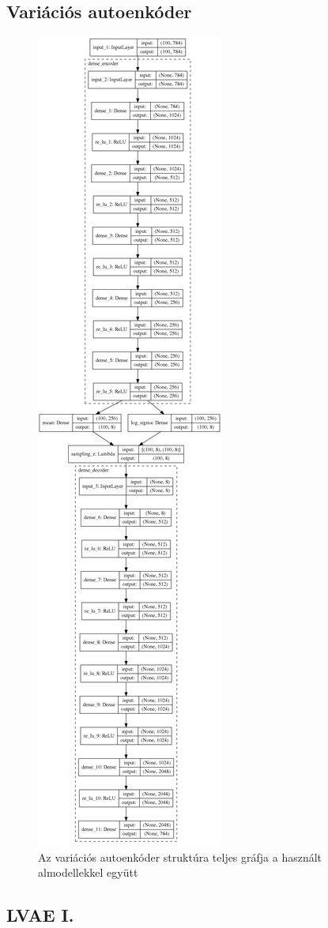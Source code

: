 \documentclass[12pt, english]{article}
\begin{document}
\subsection*{Variációs autoenkóder}
\label{sec:vae}

\begin{figure}[H]
    \centering
    \includegraphics[width=0.2\linewidth]{DenseVAE_vertical.png} 
    \caption{Az variációs autoenkóder struktúra teljes gráfja a használt almodellekkel együtt} 
    \label{fig:sűrű-variational-auto-encoder}
\end{figure}

\subsection*{LVAE I.}
\label{sec:lvae1}
\end{document}
